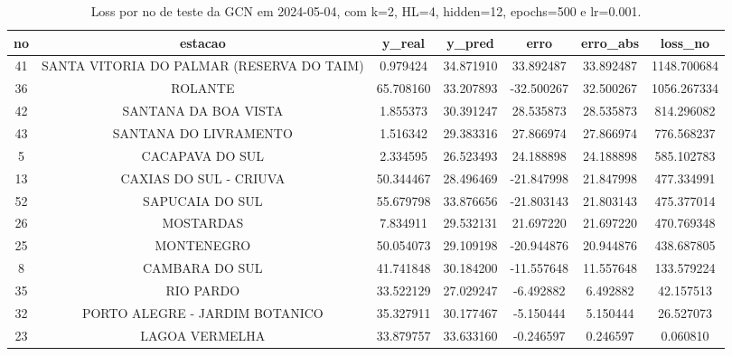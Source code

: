 \begin{table}[h]
\centering
\caption{Loss por no de teste da GCN em 2024-05-04, com k=2, HL=4, hidden=12, epochs=500 e lr=0.001.}
\label{tab:gcn_loss_k2_hl4_h12_e500_d20240504}
\begin{tabular}{ccccccc}
\toprule
no & estacao & y\_real & y\_pred & erro & erro\_abs & loss\_no \\
\midrule
41 & SANTA VITORIA DO PALMAR (RESERVA DO TAIM) & 0.979424 & 34.871910 & 33.892487 & 33.892487 & 1148.700684 \\
36 & ROLANTE & 65.708160 & 33.207893 & -32.500267 & 32.500267 & 1056.267334 \\
42 & SANTANA DA BOA VISTA & 1.855373 & 30.391247 & 28.535873 & 28.535873 & 814.296082 \\
43 & SANTANA DO LIVRAMENTO & 1.516342 & 29.383316 & 27.866974 & 27.866974 & 776.568237 \\
5 & CACAPAVA DO SUL & 2.334595 & 26.523493 & 24.188898 & 24.188898 & 585.102783 \\
13 & CAXIAS DO SUL - CRIUVA & 50.344467 & 28.496469 & -21.847998 & 21.847998 & 477.334991 \\
52 & SAPUCAIA DO SUL & 55.679798 & 33.876656 & -21.803143 & 21.803143 & 475.377014 \\
26 & MOSTARDAS & 7.834911 & 29.532131 & 21.697220 & 21.697220 & 470.769348 \\
25 & MONTENEGRO & 50.054073 & 29.109198 & -20.944876 & 20.944876 & 438.687805 \\
8 & CAMBARA DO SUL & 41.741848 & 30.184200 & -11.557648 & 11.557648 & 133.579224 \\
35 & RIO PARDO & 33.522129 & 27.029247 & -6.492882 & 6.492882 & 42.157513 \\
32 & PORTO ALEGRE - JARDIM BOTANICO & 35.327911 & 30.177467 & -5.150444 & 5.150444 & 26.527073 \\
23 & LAGOA VERMELHA & 33.879757 & 33.633160 & -0.246597 & 0.246597 & 0.060810 \\
\bottomrule
\end{tabular}
\end{table}
